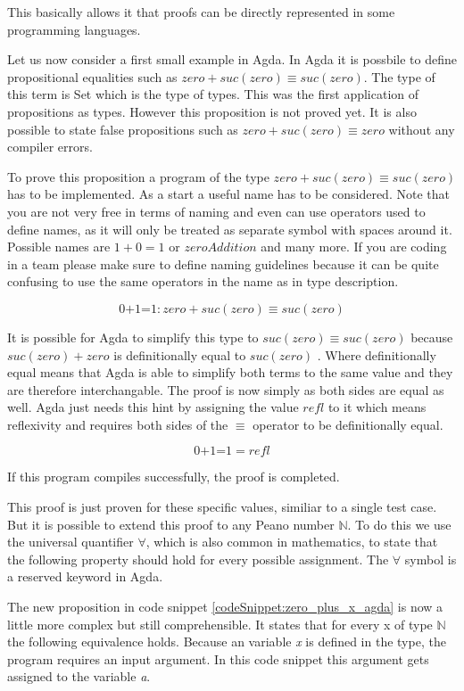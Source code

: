 This basically allows it that proofs can be directly represented in some programming languages.

Let us now consider a first small example in Agda.
In Agda it is possbile to define propositional equalities such as $zero + suc(zero) \equiv suc(zero)$. The type of this term is Set which is the type of types. This was the first application of propositions as types.
However this proposition is not proved yet. It is also possible to state false propositions such as $zero + suc(zero) \equiv zero$ without any compiler errors.

To prove this proposition a program of the type $zero + suc(zero) \equiv suc(zero)$ has to be implemented.
As a start a useful name has to be considered. Note that you are not very free in terms of naming and even can use operators used to define names, as it will only be treated as separate symbol with spaces around it. Possible names are $1+0=1$ or $zeroAddition$ and many more. 
If you are coding in a team please make sure to define naming guidelines because it can be quite confusing to use the same operators in the name as in type description.

$$\text{0+1=1} : zero + suc(zero) \equiv suc(zero)$$

It is possible for Agda to simplify this type to $suc(zero) \equiv suc(zero)$ because $suc(zero) + zero$ is definitionally equal to $suc(zero)$ . Where definitionally equal means that Agda is able to simplify both terms to the same value and they are therefore interchangable.
The proof is now simply as both sides are equal as well. Agda just needs this hint by assigning the value $refl$ to it which means reflexivity and requires both sides of the $\equiv$ operator to be definitionally equal.

$$\text{0+1=1} = refl$$

If this program compiles successfully, the proof is completed.

This proof is just proven for these specific values, similiar to a single test case. But it is possible to extend this proof to any Peano number $\mathbb{N}$. 
To do this we use the universal quantifier $\forall$, which is also common in mathematics, to state that the following property should hold for every possible assignment\cite{plfa2019}.
The $\forall$ symbol is a reserved keyword in Agda.

The new proposition in code snippet \ref{codeSnippet:zero_plus_x_agda} is now a little more complex but still comprehensible. It states that for every x of type $\mathbb{N}$ the following equivalence holds. 
Because an variable \emph{x} is defined in the type, the program requires an input argument. In this code snippet this argument gets assigned to the variable \emph{a}.

